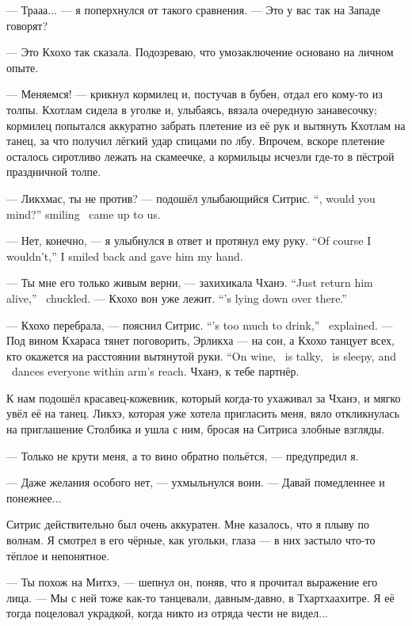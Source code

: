 --- Трааа... --- я поперхнулся от такого сравнения.
--- Это у вас так на Западе говорят?

--- Это Кхохо так сказала.
Подозреваю, что умозаключение основано на личном опыте.

--- Меняемся! --- крикнул кормилец и, постучав в бубен, отдал его кому-то из толпы.
Кхотлам сидела в уголке и, улыбаясь, вязала очередную занавесочку;
кормилец попытался аккуратно забрать плетение из её рук и вытянуть Кхотлам на танец, за что получил лёгкий удар спицами по лбу.
Впрочем, вскоре плетение осталось сиротливо лежать на скамеечке, а кормильцы исчезли где-то в пёстрой праздничной толпе.

{--- Ликхмас, ты не против? --- подошёл улыбающийся Ситрис.}
{``\Likchmas, would you mind?'' smiling \Sitris\ came up to us.}

{--- Нет, конечно, --- я улыбнулся в ответ и протянул ему руку.}
{``Of course I wouldn't,'' I smiled back and gave him my hand.}

{--- Ты мне его только живым верни, --- захихикала Чханэ.}
{``Just return him alive,'' \Chhanei\ chuckled.}
{--- Кхохо вон уже лежит.}
{``\Kchoho's lying down over there.''}

{--- Кхохо перебрала, --- пояснил Ситрис.}
{``\Kchoho's too much to drink,'' \Sitris\ explained.}
{--- Под вином Кхараса тянет поговорить, Эрликха --- на сон, а Кхохо танцует всех, кто окажется на расстоянии вытянутой руки.}
{``On wine, \Kcharas\ is talky, \Oerlikch\ is sleepy, and \Kchoho\ dances everyone within arm's reach.}
Чханэ, к тебе партнёр.

К нам подошёл красавец-кожевник, который когда-то ухаживал за Чханэ, и мягко увёл её на танец.
Ликхэ, которая уже хотела пригласить меня, вяло откликнулась на приглашение Столбика и ушла с ним, бросая на Ситриса злобные взгляды.

--- Только не крути меня, а то вино обратно польётся, --- предупредил я.

--- Даже желания особого нет, --- ухмыльнулся воин.
--- Давай помедленнее и понежнее...

\asterism

Ситрис действительно был очень аккуратен.
Мне казалось, что я плыву по волнам.
Я смотрел в его чёрные, как угольки, глаза --- в них застыло что-то тёплое и непонятное.

--- Ты похож на Митхэ, --- шепнул он, поняв, что я прочитал выражение его лица.
--- Мы с ней тоже как-то танцевали, давным-давно, в Тхартхаахитре.
Я её тогда поцеловал украдкой, когда никто из отряда чести не видел...

